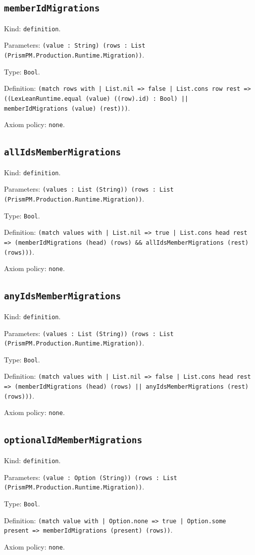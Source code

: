 \documentclass[11pt]{article}
\begin{document}
\subsection*{\texttt{memberIdMigrations}}
\noindent Kind: \texttt{definition}.\par
\noindent Parameters: \texttt{(value : String) (rows : List (PrismPM.Production.Runtime.Migration))}.\par
\noindent Type: \texttt{Bool}.\par
\noindent Definition: \texttt{(match rows with | List.nil => false | List.cons row rest => ((LexLeanRuntime.equal (value) ((row).id) : Bool) || memberIdMigrations (value) (rest)))}.\par
\noindent Axiom policy: \texttt{none}.\par
\subsection*{\texttt{allIdsMemberMigrations}}
\noindent Kind: \texttt{definition}.\par
\noindent Parameters: \texttt{(values : List (String)) (rows : List (PrismPM.Production.Runtime.Migration))}.\par
\noindent Type: \texttt{Bool}.\par
\noindent Definition: \texttt{(match values with | List.nil => true | List.cons head rest => (memberIdMigrations (head) (rows) \&\& allIdsMemberMigrations (rest) (rows)))}.\par
\noindent Axiom policy: \texttt{none}.\par
\subsection*{\texttt{anyIdsMemberMigrations}}
\noindent Kind: \texttt{definition}.\par
\noindent Parameters: \texttt{(values : List (String)) (rows : List (PrismPM.Production.Runtime.Migration))}.\par
\noindent Type: \texttt{Bool}.\par
\noindent Definition: \texttt{(match values with | List.nil => false | List.cons head rest => (memberIdMigrations (head) (rows) || anyIdsMemberMigrations (rest) (rows)))}.\par
\noindent Axiom policy: \texttt{none}.\par
\subsection*{\texttt{optionalIdMemberMigrations}}
\noindent Kind: \texttt{definition}.\par
\noindent Parameters: \texttt{(value : Option (String)) (rows : List (PrismPM.Production.Runtime.Migration))}.\par
\noindent Type: \texttt{Bool}.\par
\noindent Definition: \texttt{(match value with | Option.none => true | Option.some present => memberIdMigrations (present) (rows))}.\par
\noindent Axiom policy: \texttt{none}.\par
\end{document}
